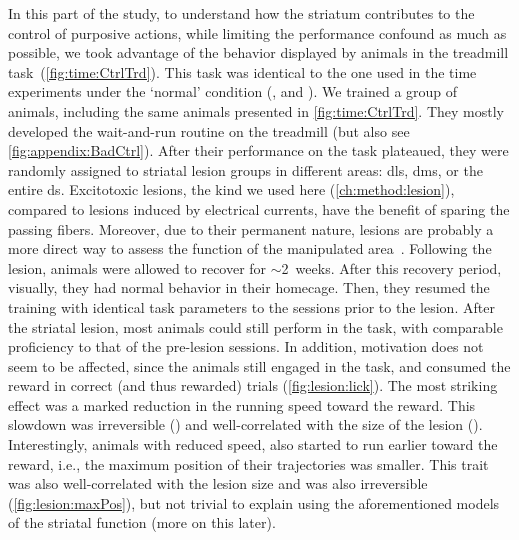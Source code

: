 \par
In this part of the study, to understand how the striatum contributes to the control of purposive actions, while limiting the performance confound as much as possible, we took advantage of the behavior displayed by animals in the treadmill task~(\autoref{fig:time:CtrlTrd}).
This task was identical to the one used in the time experiments under the `normal' condition (, and ).
We trained a group of animals, including the same animals presented in \autoref{fig:time:CtrlTrd}.
They mostly developed the wait-and-run routine on the treadmill (but also see \autoref{fig:appendix:BadCtrl}).
After their performance on the task plateaued, they were randomly assigned to striatal lesion groups in different areas:
    \gls{dls}, \gls{dms}, or the entire \gls{ds}.
Excitotoxic lesions, the kind we used here (\autoref{ch:method:lesion}), compared to lesions induced by electrical currents, have the benefit of sparing the passing fibers.
Moreover, due to their permanent nature, lesions are probably a more direct way to assess the function of the manipulated area~\cite{Otchy2015Nature}.
Following the lesion, animals were allowed to recover for $\sim$2~weeks.
After this recovery period, visually, they had normal behavior in their homecage.
Then, they resumed the training with identical task parameters to the sessions prior to the lesion.
After the striatal lesion, most animals could still perform in the task, with comparable proficiency to that of the pre-lesion sessions.
In addition, motivation does not seem to be affected, since the animals still engaged in the task, and consumed the reward in correct (and thus rewarded) trials (\autoref{fig:lesion:lick}).
The most striking effect was a marked reduction in the running speed toward the reward.
This slowdown was irreversible () and well-correlated with the size of the lesion ().
Interestingly, animals with reduced speed, also started to run earlier toward the reward, i.e., the maximum position of their trajectories was smaller.
This trait was also well-correlated with the lesion size and was also irreversible (\autoref{fig:lesion:maxPos}), but not trivial to explain using the aforementioned models of the striatal function (more on this later).
